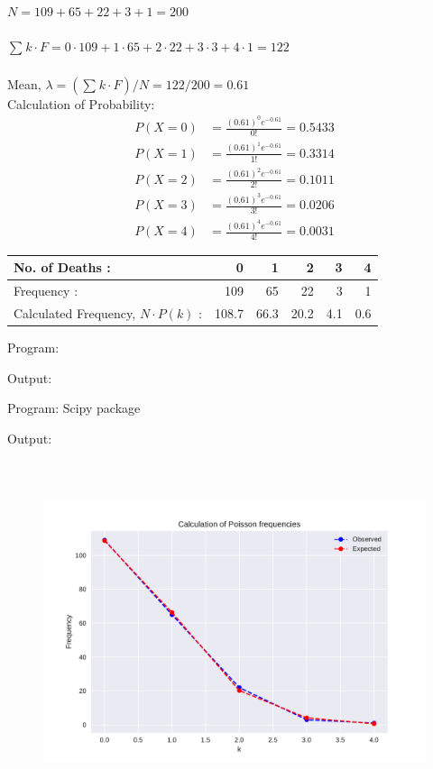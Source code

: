 \documentclass[a4paper,11pt,openright]{report}
\begin{document}
\begin{enumerate}
$N = 109 + 65 + 22 + 3 + 1 = 200$ \\ \\
$\sum_{}^{} k \cdot F = 0 \cdot 109 + 1 \cdot 65 + 2 \cdot 22 + 3 \cdot 3 + 4 \cdot 1 = 122$ \\ \\
Mean, $\lambda = (\sum_{}^{} k \cdot F)/N = 122/200 = 0.61$ \\

Calculation of Probability:
\begin{equation*}
		\begin{split}
				P(X = 0) & = \frac{(0.61)^{0} e^{-0.61}}{0!} = 0.5433 \\
				P(X = 1) & = \frac{(0.61)^{1} e^{-0.61}}{1!} = 0.3314 \\
				P(X = 2) & = \frac{(0.61)^{2} e^{-0.61}}{2!} = 0.1011 \\
				P(X = 3) & = \frac{(0.61)^{3} e^{-0.61}}{3!} = 0.0206 \\
				P(X = 4) & = \frac{(0.61)^{4} e^{-0.61}}{4!} = 0.0031
		\end{split}
\end{equation*}

\begin{tabular}{|l|r|r|r|r|r|}
\hline
No. of Deaths : & 0 & 1 & 2 & 3 & 4 \\
\hline
Frequency : & 109 & 65 & 22 & 3 & 1 \\
\hline
Calculated Frequency, $N \cdot P(k)$ : & 108.7 & 66.3 & 20.2 & 4.1 & 0.6 \\
\hline
\end{tabular}

\vspace{1.5cm}

Program:

Output:


\pagebreak

Program: Scipy package

Output:


\begin{figure}[ht!]
\includegraphics[width=20cm,height=10cm,keepaspectratio]{frequency.pdf}
\centering
\end{figure}

\end{enumerate}
\end{document}
